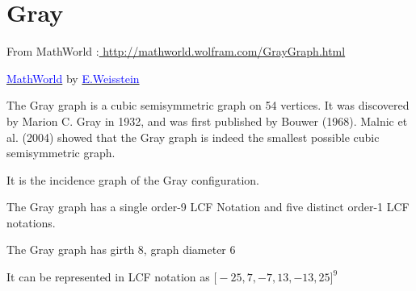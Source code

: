 \newpage\section{Gray}
From MathWorld :\url{ http://mathworld.wolfram.com/GrayGraph.html}

\href{http://mathworld.wolfram.com/topics/GraphTheory.html}%
           {\textcolor{blue}{MathWorld}} by \href{http://en.wikipedia.org/wiki/Eric_W._Weisstein}%
           {\textcolor{blue}{E.Weisstein}} 
           
           
The Gray graph is a cubic semisymmetric graph on 54 vertices. It was discovered by Marion C. Gray in 1932, and was first published by Bouwer (1968). Malnic et al. (2004) showed that the Gray graph is indeed the smallest possible cubic semisymmetric graph.

It is the incidence graph of the Gray configuration.

The Gray graph has a single order-9 LCF Notation  and five distinct order-1 LCF notations.

The Gray graph has girth 8, graph diameter 6

It can be   represented in LCF notation as  $\big[-25,7,-7,13,-13,25\big]^9$ 

\begin{center}
\begin{tkzexample}[vbox]
\end{tkzexample} 
\end{center}

\endinput